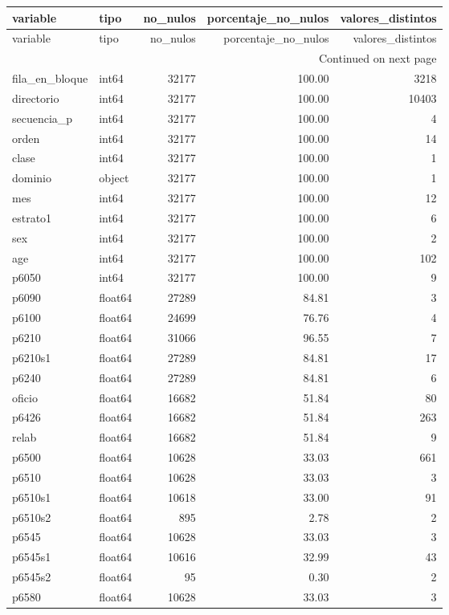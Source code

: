 \begin{longtable}{llrrr}
\toprule
variable & tipo & no\_nulos & porcentaje\_no\_nulos & valores\_distintos \\
\midrule
\endfirsthead
\toprule
variable & tipo & no\_nulos & porcentaje\_no\_nulos & valores\_distintos \\
\midrule
\endhead
\midrule
\multicolumn{5}{r}{Continued on next page} \\
\midrule
\endfoot
\bottomrule
\endlastfoot
fila\_en\_bloque & int64 & 32177 & 100.00 & 3218 \\
directorio & int64 & 32177 & 100.00 & 10403 \\
secuencia\_p & int64 & 32177 & 100.00 & 4 \\
orden & int64 & 32177 & 100.00 & 14 \\
clase & int64 & 32177 & 100.00 & 1 \\
dominio & object & 32177 & 100.00 & 1 \\
mes & int64 & 32177 & 100.00 & 12 \\
estrato1 & int64 & 32177 & 100.00 & 6 \\
sex & int64 & 32177 & 100.00 & 2 \\
age & int64 & 32177 & 100.00 & 102 \\
p6050 & int64 & 32177 & 100.00 & 9 \\
p6090 & float64 & 27289 & 84.81 & 3 \\
p6100 & float64 & 24699 & 76.76 & 4 \\
p6210 & float64 & 31066 & 96.55 & 7 \\
p6210s1 & float64 & 27289 & 84.81 & 17 \\
p6240 & float64 & 27289 & 84.81 & 6 \\
oficio & float64 & 16682 & 51.84 & 80 \\
p6426 & float64 & 16682 & 51.84 & 263 \\
relab & float64 & 16682 & 51.84 & 9 \\
p6500 & float64 & 10628 & 33.03 & 661 \\
p6510 & float64 & 10628 & 33.03 & 3 \\
p6510s1 & float64 & 10618 & 33.00 & 91 \\
p6510s2 & float64 & 895 & 2.78 & 2 \\
p6545 & float64 & 10628 & 33.03 & 3 \\
p6545s1 & float64 & 10616 & 32.99 & 43 \\
p6545s2 & float64 & 95 & 0.30 & 2 \\
p6580 & float64 & 10628 & 33.03 & 3 \\

\end{longtable}
